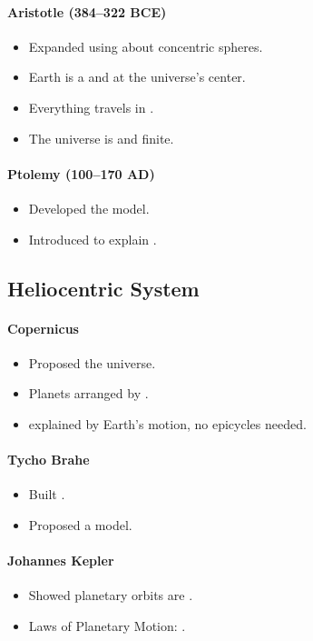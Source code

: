 \documentclass[12pt]{article}
\newcommand{\fillin}[1]{\uline{\hspace{#1}}}
\begin{document}
\paragraph{Aristotle (384–322 BCE)}
\begin{itemize}
  \item Expanded \fillin{5cm} using about \fillin{2cm} concentric spheres.
  \item Earth is a \fillin{2cm} and \fillin{2.5cm} at the universe's center.
  \item Everything travels in \fillin{8cm}.
  \item The universe is \fillin{5cm} and finite.
\end{itemize}

\paragraph{Ptolemy (100–170 AD)}
\begin{itemize}
  \item Developed the \fillin{5cm} model.
  \item Introduced \fillin{5cm} to explain \fillin{5cm}.
\end{itemize}

\subsection*{Heliocentric System}
\paragraph{Copernicus}
\begin{itemize}
  \item Proposed the \fillin{5cm} universe.
  \item Planets arranged by \fillin{8cm}.
  \item \fillin{3cm} explained by Earth’s motion, no epicycles needed.
\end{itemize}

\paragraph{Tycho Brahe}
\begin{itemize}
  \item Built \fillin{3cm}.
  \item Proposed a \fillin{3cm} model.
\end{itemize}

\paragraph{Johannes Kepler}
\begin{itemize}
  \item Showed planetary orbits are \fillin{2.5cm}.
  \item Laws of Planetary Motion: \fillin{5cm}.
\end{itemize}
\end{document}
